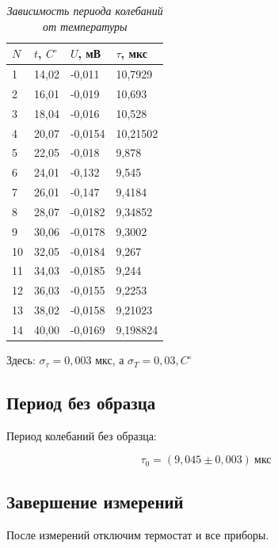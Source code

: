 \documentclass[a4paper,12pt]{article}
\begin{document}
\begin{table}[!ht]
    \centering
    \begin{tabular}{|l|l|l|l|}
    \hline
        $N$ & $t$, $C^\circ$ & $U$, мВ & $\tau$, мкс \\ \hline
        1 & 14,02 & -0,011 & 10,7929 \\ \hline
        2 & 16,01 & -0,019 & 10,693 \\ \hline
        3 & 18,04 & -0,016 & 10,528 \\ \hline
        4 & 20,07 & -0,0154 & 10,21502 \\ \hline
        5 & 22,05 & -0,018 & 9,878 \\ \hline
        6 & 24,01 & -0,132 & 9,545 \\ \hline
        7 & 26,01 & -0,147 & 9,4184 \\ \hline
        8 & 28,07 & -0,0182 & 9,34852 \\ \hline
        9 & 30,06 & -0,0178 & 9,3002 \\ \hline
        10 & 32,05 & -0,0184 & 9,267 \\ \hline
        11 & 34,03 & -0,0185 & 9,244 \\ \hline
        12 & 36,03 & -0,0155 & 9,2253 \\ \hline
        13 & 38,02 & -0,0158 & 9,21023 \\ \hline
        14 & 40,00 & -0,0169 & 9,198824 \\ \hline
    \end{tabular}\caption{\textit{Зависимость периода колебаний от температуры}}\label{table:1}
\end{table}

Здесь: $\sigma_\tau = 0,003$ мкс, а $\sigma_T = 0,03, C^\circ$

\subsection{Период без образца}

Период колебаний без образца:

\begin{equation*}
    \tau_0 = (9,045 \pm 0,003) \ \text{мкс}
\end{equation*}

\subsection{Завершение измерений}

После измерений отключим термостат и все приборы.
\end{document}
